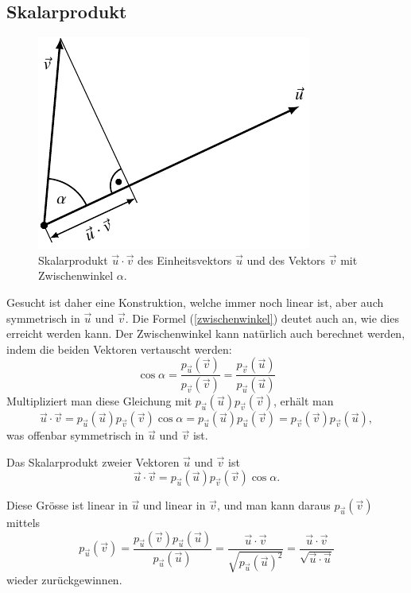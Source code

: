 \subsection{Skalarprodukt}
\begin{figure}
\begin{center}
\includegraphics{4/images/skalarprodukt.pdf}
\end{center}
\caption{Skalarprodukt $\vec u\cdot \vec v$ des Einheitsvektors $\vec u$
und des Vektors $\vec v$ mit Zwischenwinkel
$\alpha$.\label{image-skalarprodukt}}
\end{figure}
Gesucht ist daher eine Konstruktion, welche immer noch linear ist,
aber auch symmetrisch in $\vec u$ und $\vec v$.
Die Formel (\ref{zwischenwinkel}) deutet auch an, wie dies erreicht
werden kann.
Der Zwischenwinkel kann natürlich auch berechnet werden,
indem die beiden Vektoren vertauscht werden:
\[
\cos \alpha
=
\frac{p_{\vec u}(\vec v)}{p_{\vec v}(\vec v)}
=
\frac{p_{\vec v}(\vec u)}{p_{\vec u}(\vec u)}
\]
Multipliziert man diese Gleichung mit
$
p_{\vec u}(\vec u)
p_{\vec v}(\vec v)
$, erhält man
\[
\vec u\cdot\vec v
=
p_{\vec u}(\vec u)
p_{\vec v}(\vec v)
\cos\alpha =
p_{\vec u}(\vec u)p_{\vec u}(\vec v)
=
p_{\vec v}(\vec v)p_{\vec v}(\vec u),
\]
was offenbar symmetrisch in $\vec u$ und $\vec v$ ist.

\begin{definition}Das Skalarprodukt zweier Vektoren $\vec u$ und
$\vec v$ ist
\[
\vec u\cdot\vec v
=
p_{\vec u}(\vec u)
p_{\vec v}(\vec v)
\cos\alpha.
\]
\end{definition}
Diese Grösse ist linear in $\vec u$ und linear in $\vec v$, und man kann
daraus $p_{\vec u}(\vec v)$ mittels
\[
p_{\vec u}(\vec v)
=
\frac{p_{\vec u}(\vec v)p_{\vec u}(\vec u)}{p_{\vec u}(\vec u)}
=
\frac{\vec u\cdot\vec v}{\sqrt{p_{\vec u}(\vec u)^2}}
=
\frac{\vec u\cdot\vec v}{\sqrt{\vec u\cdot \vec u}}
\]
wieder zurückgewinnen.

